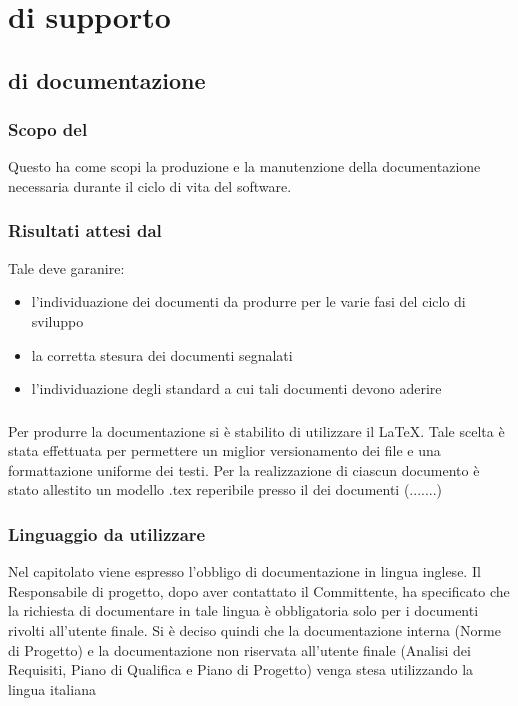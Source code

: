 \section{ di supporto}
\subsection{ di documentazione}
\subsubsection{Scopo del }
Questo  ha come scopi la produzione e la manutenzione della documentazione necessaria durante il ciclo di vita del software.
\subsubsection{Risultati attesi dal }
Tale  deve garanire:
\begin{itemize}
\item l'individuazione dei documenti da produrre per le varie fasi del ciclo di sviluppo
\item la corretta stesura dei documenti segnalati
\item l'individuazione degli standard a cui tali documenti devono aderire
\end{itemize}
  \subsubsection{}
  Per produrre la documentazione si è stabilito di utilizzare il  \LaTeX. Tale scelta è stata effettuata per permettere un miglior versionamento dei file e una formattazione uniforme dei testi.
  Per la realizzazione di ciascun documento \`e stato allestito un modello .tex reperibile presso il  dei documenti (.......)

  \subsubsection{Linguaggio da utilizzare}
  Nel capitolato viene espresso l'obbligo di documentazione in lingua inglese. Il Responsabile di progetto, dopo aver contattato il Committente, ha specificato che la richiesta di documentare in tale lingua è obbligatoria solo per i documenti rivolti all'utente finale. Si è deciso quindi che la documentazione interna (Norme di Progetto) e la documentazione non riservata all'utente finale (Analisi dei Requisiti, Piano di Qualifica e Piano di Progetto) venga stesa utilizzando la lingua italiana  
  
